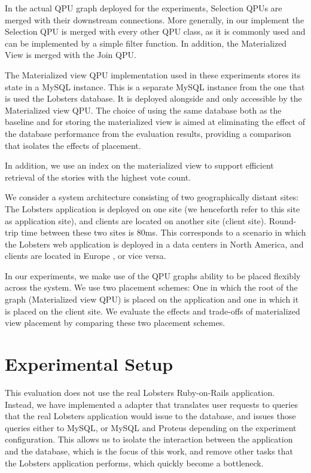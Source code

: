 In the actual QPU graph deployed for the experiments, Selection QPUs are merged with their downstream connections.
More generally, in our implement the Selection QPU is merged with every other QPU class,
as it is commonly used and can be implemented by a simple filter function.
In addition, the Materialized View is merged with the Join QPU.

The Materialized view QPU implementation used in these experiments stores its state in a MySQL instance.
This is a separate MySQL instance from the one that is used the Lobsters database.
It is deployed alongside and only accessible by the Materialized view QPU.
The choice of using the same database both as the baseline and for storing the materialized view is aimed at eliminating
the effect of the database performance from the evaluation results,
providing a comparison that isolates the effects of placement.

In addition, we use an index on the materialized view to support efficient retrieval of the stories with the highest vote count.

\bigskip
\noindent
We consider a system architecture consisting of two geographically distant sites:
The Lobsters application is deployed on one site (we henceforth refer to this site as application site),
and clients are located on another site (client site).
Round-trip time between these two sites is 80ms.
This corresponds to a scenario in which the Lobsters web application is deployed in a data centers in North America,
and clients are located in Europe \cite{pbailis:hats}, or vice versa.

In our experiments, we make use of the QPU graphs ability to be placed flexibly across the system.
We use two placement schemes:
One in which the root of the graph (Materialized view QPU) is placed on the application and one in which it is placed on
the client site.
We evaluate the effects and trade-offs of materialized view placement by comparing these two placement schemes.


\section{Experimental Setup}

This evaluation does not use the real Lobsters Ruby-on-Rails application.
Instead, we have implemented a adapter that translates user requests to queries that the real
Lobsters application would issue to the database,
and issues those queries either to MySQL, or MySQL and Proteus depending on the experiment configuration.
This allows us to isolate the interaction between the application and the database, which is the focus of this work,
and remove other tasks that the Lobsters application performs, which quickly become a bottleneck.

